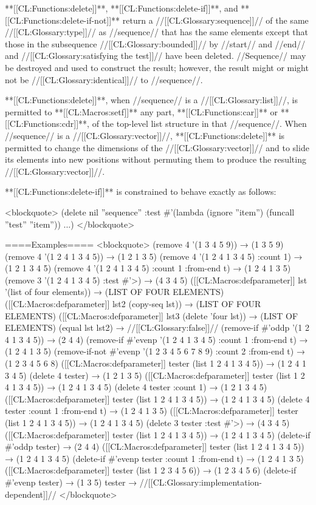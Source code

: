 **[[CL:Functions:delete]]**, **[[CL:Functions:delete-if]]**, and **[[CL:Functions:delete-if-not]]** return a //[[CL:Glossary:sequence]]// of the same //[[CL:Glossary:type]]// as //sequence// that has the same elements except that those in the subsequence //[[CL:Glossary:bounded]]// by //start// and //end// and //[[CL:Glossary:satisfying the test]]// have been deleted. //Sequence// may be destroyed and used to construct the result; however, the result might or might not be //[[CL:Glossary:identical]]// to //sequence//.

**[[CL:Functions:delete]]**, when //sequence// is a //[[CL:Glossary:list]]//, is permitted to **[[CL:Macros:setf]]** any part, **[[CL:Functions:car]]** or **[[CL:Functions:cdr]]**, of the top-level list structure in that //sequence//. When //sequence// is a //[[CL:Glossary:vector]]//, **[[CL:Functions:delete]]** is permitted to change the dimensions of the //[[CL:Glossary:vector]]// and to slide its elements into new positions without permuting them to produce the resulting //[[CL:Glossary:vector]]//.

**[[CL:Functions:delete-if]]** is constrained to behave exactly as follows:

<blockquote> (delete nil ''sequence'' :test #'(lambda (ignore ''item'') (funcall ''test'' ''item'')) ...) </blockquote>


====Examples==== <blockquote> (remove 4 '(1 3 4 5 9)) → (1 3 5 9) (remove 4 '(1 2 4 1 3 4 5)) → (1 2 1 3 5) (remove 4 '(1 2 4 1 3 4 5) :count 1) → (1 2 1 3 4 5) (remove 4 '(1 2 4 1 3 4 5) :count 1 :from-end t) → (1 2 4 1 3 5) (remove 3 '(1 2 4 1 3 4 5) :test #'>) → (4 3 4 5) ([[CL:Macros:defparameter]] lst '(list of four elements)) → (LIST OF FOUR ELEMENTS) ([[CL:Macros:defparameter]] lst2 (copy-seq lst)) → (LIST OF FOUR ELEMENTS) ([[CL:Macros:defparameter]] lst3 (delete 'four lst)) → (LIST OF ELEMENTS) (equal lst lst2) → //[[CL:Glossary:false]]// (remove-if #'oddp '(1 2 4 1 3 4 5)) → (2 4 4) (remove-if #'evenp '(1 2 4 1 3 4 5) :count 1 :from-end t) → (1 2 4 1 3 5) (remove-if-not #'evenp '(1 2 3 4 5 6 7 8 9) :count 2 :from-end t) → (1 2 3 4 5 6 8) ([[CL:Macros:defparameter]] tester (list 1 2 4 1 3 4 5)) → (1 2 4 1 3 4 5) (delete 4 tester) → (1 2 1 3 5) ([[CL:Macros:defparameter]] tester (list 1 2 4 1 3 4 5)) → (1 2 4 1 3 4 5) (delete 4 tester :count 1) → (1 2 1 3 4 5) ([[CL:Macros:defparameter]] tester (list 1 2 4 1 3 4 5)) → (1 2 4 1 3 4 5) (delete 4 tester :count 1 :from-end t) → (1 2 4 1 3 5) ([[CL:Macros:defparameter]] tester (list 1 2 4 1 3 4 5)) → (1 2 4 1 3 4 5) (delete 3 tester :test #'>) → (4 3 4 5) ([[CL:Macros:defparameter]] tester (list 1 2 4 1 3 4 5)) → (1 2 4 1 3 4 5) (delete-if #'oddp tester) → (2 4 4) ([[CL:Macros:defparameter]] tester (list 1 2 4 1 3 4 5)) → (1 2 4 1 3 4 5) (delete-if #'evenp tester :count 1 :from-end t) → (1 2 4 1 3 5) ([[CL:Macros:defparameter]] tester (list 1 2 3 4 5 6)) → (1 2 3 4 5 6) (delete-if #'evenp tester) → (1 3 5) tester → //[[CL:Glossary:implementation-dependent]]// </blockquote>

